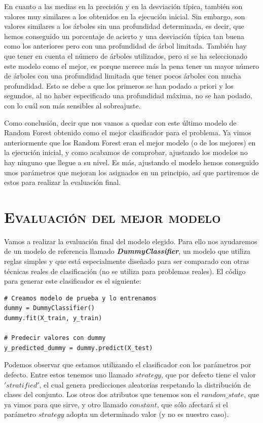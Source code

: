 \documentclass[11pt,a4paper]{article}
\begin{document}
En cuanto a las medias en la precisión y en la desviación típica, también son valores muy similares a los obtenidos en la ejecución
inicial. Sin embargo, son valores similares a los árboles sin una profundidad determinada, es decir, que hemos conseguido un porcentaje de
acierto y una desviación típica tan buena como los anteriores pero con una profundidad de árbol limitada. También hay que tener en cuenta
el número de árboles utilizados, pero si se ha seleccionado este modelo como el mejor, es porque merece más la pena tener un mayor número
de árboles con una profundidad limitada que tener pocos árboles con mucha profundidad. Esto se debe a que los primeros se han podado a
priori y los segundos, al no haber especificado una profundidad máxima, no se han podado, con lo cuál son más sensibles al sobreajuste.

Como conclusión, decir que nos vamos a quedar con este último modelo de Random Forest obtenido como el mejor clasificador para el problema.
Ya vimos anteriormente que los Random Forest eran el mejor modelo (o de los mejores) en la ejecución inicial, y como acabamos de comprobar,
ajustando los modelos no hay ninguno que llegue a su nivel. Es más, ajustando el modelo hemos conseguido unos parámetros que mejoran los
asignados en un principio, así que partiremos de estos para realizar la evaluación final.

\section{\textsc{Evaluación del mejor modelo}}

Vamos a realizar la evaluación final del modelo elegido. Para ello nos ayudaremos de un modelo de referencia llamado \textbf{\textit{DummyClassifier}}\cite{DummyClassifier}, un modelo que utiliza reglas simples y que está especialmente diseñado para ser comparado con otras técnicas reales de clasificación (no se utiliza para problemas reales). El código para generar este clasificador es el siguiente:

\begin{lstlisting}
# Creamos modelo de prueba y lo entrenamos
dummy = DummyClassifier()
dummy.fit(X_train, y_train)

# Predecir valores con dummy
y_predicted_dummy = dummy.predict(X_test)
\end{lstlisting}

Podemos observar que estamos utilizando el clasificador con los parámetros por defecto. Entre estos tenemos uno llamado $strategy$, que por defecto tiene el valor $'stratified'$, el cual genera predicciones aleatorias respetando la distribución de clases del conjunto. Los otros dos atributos que tenemos son el $random\_state$, que ya vimos para que sirve, y otro llamado $constant$, que sólo afectará si el parámetro $strategy$ adopta un determinado valor (y no es nuestro caso).
\end{document}
